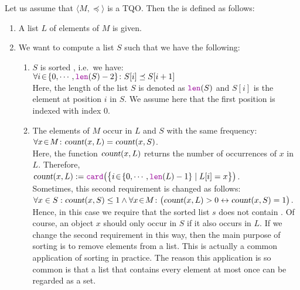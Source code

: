 Let us assume that $\langle M, \preceq \rangle$ is a  \textsc{TQO}.
Then the  is defined as follows:
\begin{enumerate}
\item A list $L$ of elements of $M$ is given.
\item We want to compute a list $S$ such that we have the following: 
  \begin{enumerate}
  \item $S$ is sorted , i.e.~we have: \\[0.2cm]
        \hspace*{1.3cm} 
        $\forall i \el \{ 0, \cdots, \mytt{len}(S)-2 \} \colon S[i] \preceq S[i+1]$ 
        \\[0.2cm]
        Here, the length of the list $S$ is denoted as $\mytt{len}(S)$ and $S[i]$ is the element at position
        $i$ in $S$.  We assume here that the first position is indexed with index $0$.
  \item The elements of $M$ occur in $L$ and $S$ with the same frequency: \\[0.2cm]
        \hspace*{1.3cm} 
        $\forall x\!\in\! M \colon \textsl{count}(x,L) = \textsl{count}(x,S)$.
        \\[0.2cm]
        Here, the function $\textsl{count}(x,L)$ returns the number of occurrences of $x$ in $L$.
        Therefore,  \\[0.2cm]
        \hspace*{1.3cm}
        $\textsl{count}(x,L) := \mytt{card}\bigl(\bigl\{ i \el \{0,\cdots,\mytt{len}(L)-1\} \mid L[i] = x \bigr\}\bigr)$.
        \\[0.2cm]
        Sometimes, this second requirement is changed as follows:
        \\[0.2cm]
        \hspace*{1.3cm}
        $\forall x \in S: \textsl{count}(x,S) \leq 1 \wedge \forall x\!\in\! M \colon \bigl(\textsl{count}(x,L) > 0 \leftrightarrow \textsl{count}(x,S) = 1\bigr)$.
        \\[0.2cm]
        Hence, in this case we require that the sorted list $s$ does not contain
        .
        Of course, an object $x$ should only occur in $S$ if it also occurs in $L$.  If we change
        the second requirement in this way, then the main purpose of sorting is to remove 
        elements from a list.  This is actually a common application of sorting in practice.  The
        reason this application is so common is that a list that contains every element at
        most once can be regarded as a set.
  \end{enumerate}
\end{enumerate}

